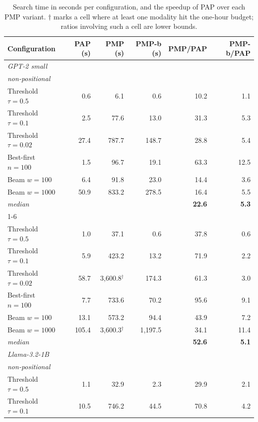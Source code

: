 \documentclass[11pt,a4paper]{article}
\begin{document}
\begin{table}[h]
\centering
\small
\caption{Search time in seconds per configuration, and the speedup of PAP over each PMP
variant. $\dagger$ marks a cell where at least one modality hit the one-hour budget; ratios
involving such a cell are lower bounds.}
\label{tab:speedup}
\begin{tabular}{lrrrrr}
\toprule
Configuration & PAP (s) & PMP (s) & PMP-b (s) & PMP/PAP & PMP-b/PAP \\
\midrule
\multicolumn{6}{l}{\itshape GPT-2 small} \\
\multicolumn{6}{l}{\quad\itshape non-positional} \\
\quad Threshold $\tau{=}0.5$ & 0.6 & 6.1 & 0.6 & 10.2 & 1.1 \\
\quad Threshold $\tau{=}0.1$ & 2.5 & 77.6 & 13.0 & 31.3 & 5.3 \\
\quad Threshold $\tau{=}0.02$ & 27.4 & 787.7 & 148.7 & 28.8 & 5.4 \\
\quad Best-first $n{=}100$ & 1.5 & 96.7 & 19.1 & 63.3 & 12.5 \\
\quad Beam $w{=}100$ & 6.4 & 91.8 & 23.0 & 14.4 & 3.6 \\
\quad Beam $w{=}1000$ & 50.9 & 833.2 & 278.5 & 16.4 & 5.5 \\
\quad \textit{median} & & & & \textbf{22.6} & \textbf{5.3} \\
\cmidrule(l){1-6}
\multicolumn{6}{l}{\quad\itshape positional} \\
\quad Threshold $\tau{=}0.5$ & 1.0 & 37.1 & 0.6 & 37.8 & 0.6 \\
\quad Threshold $\tau{=}0.1$ & 5.9 & 423.2 & 13.2 & 71.9 & 2.2 \\
\quad Threshold $\tau{=}0.02$ & 58.7 & 3,600.8$^{\dagger}$ & 174.3 & 61.3 & 3.0 \\
\quad Best-first $n{=}100$ & 7.7 & 733.6 & 70.2 & 95.6 & 9.1 \\
\quad Beam $w{=}100$ & 13.1 & 573.2 & 94.4 & 43.9 & 7.2 \\
\quad Beam $w{=}1000$ & 105.4 & 3,600.3$^{\dagger}$ & 1,197.5 & 34.1 & 11.4 \\
\quad \textit{median} & & & & \textbf{52.6} & \textbf{5.1} \\
\midrule
\multicolumn{6}{l}{\itshape Llama-3.2-1B} \\
\multicolumn{6}{l}{\quad\itshape non-positional} \\
\quad Threshold $\tau{=}0.5$ & 1.1 & 32.9 & 2.3 & 29.9 & 2.1 \\
\quad Threshold $\tau{=}0.1$ & 10.5 & 746.2 & 44.5 & 70.8 & 4.2 \\

\end{tabular}
\end{table}
\end{document}
